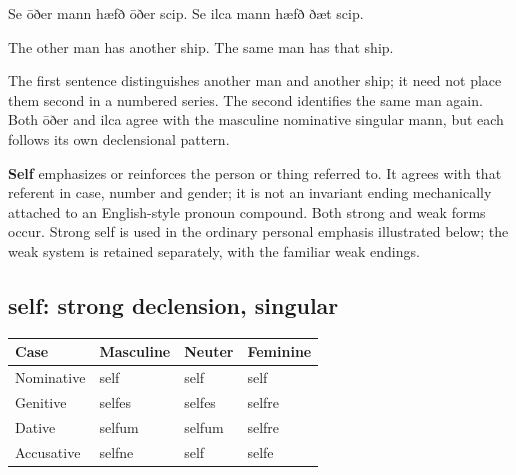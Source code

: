 Se ōðer mann hæfð ōðer scip. Se ilca mann hæfð ðæt scip.

The other man has another ship. The same man has that ship.

The first sentence distinguishes another man and another ship; it need not place them second in a numbered series. The second identifies the same man again. Both ōðer and ilca agree with the masculine nominative singular mann, but each follows its own declensional pattern.

\textbf{Self} emphasizes or reinforces the person or thing referred to. It agrees with that referent in case, number and gender; it is not an invariant ending mechanically attached to an English-style pronoun compound. Both strong and weak forms occur. Strong self is used in the ordinary personal emphasis illustrated below; the weak system is retained separately, with the familiar weak endings.

\subsection*{self: strong declension, singular}

\par\begingroup
\fontsize{10.5}{13.2}\selectfont
\setlength{\LTleft}{0pt}\setlength{\LTright}{\fill}
\noindent
\begin{tabular}{@{}>{\raggedright\arraybackslash}p{28.89mm}>{\raggedright\arraybackslash}p{28.89mm}>{\raggedright\arraybackslash}p{28.89mm}>{\raggedright\arraybackslash}p{28.89mm}@{}}
\toprule
\textbf{Case} & \textbf{Masculine} & \textbf{Neuter} & \textbf{Feminine} \\
\midrule
Nominative & self & self & self \\
Genitive & selfes & selfes & selfre \\
Dative & selfum & selfum & selfre \\
Accusative & selfne & self & selfe \\
\bottomrule
\end{tabular}
\par\endgroup

